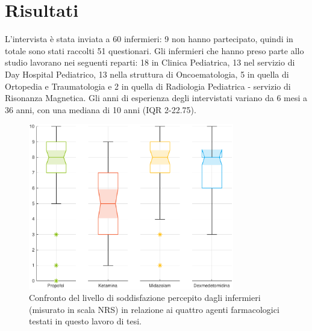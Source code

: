 \chapter{Risultati}

L'intervista è stata inviata a 60 infermieri: 9 non hanno partecipato, quindi in totale sono stati raccolti 51 questionari. Gli infermieri che hanno preso parte allo studio lavorano nei seguenti reparti: 18 in Clinica Pediatrica, 13 nel servizio di Day Hospital Pediatrico, 13 nella struttura di Oncoematologia, 5 in quella di Ortopedia e Traumatologia e 2 in quella di Radiologia Pediatrica - servizio di Risonanza Magnetica. Gli anni di esperienza degli intervistati variano da 6 mesi a 36 anni, con una mediana di 10 anni (IQR 2-22.75).

\begin{figure}[h]
    \centering
    \includegraphics[width=0.8\textwidth]{Figure/qualita-colorful.pdf}
    \caption{Confronto del livello di soddisfazione percepito dagli infermieri (misurato in scala NRS) in relazione ai quattro agenti farmacologici testati in questo lavoro di tesi.}
    \label{fig:qualitascolorful}
\end{figure}

